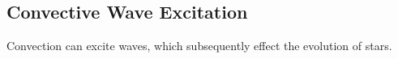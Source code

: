 {\color{purple}
\subsection{Convective Wave Excitation}
}

Convection can excite waves, which subsequently effect the evolution of stars.
